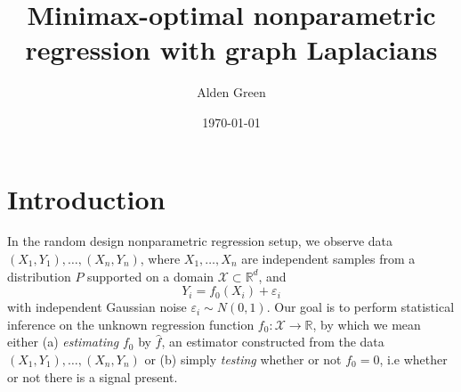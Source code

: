\documentclass{article}
\newcommand{\Reals}{\mathbb{R}}
\newcommand{\1}{\mathbf{1}}
\newcommand{\Rd}{\Reals^d}
\newcommand{\Xset}{\mathcal{X}}
\newcommand{\wh}[1]{\widehat{#1}}
\theoremstyle{alden}
\theoremstyle{aldenthm}
\theoremstyle{definition}
\theoremstyle{remark}
\begin{document}
\title{Minimax-optimal nonparametric regression with graph Laplacians}
\author{Alden Green}
\date{\today}
\maketitle

\section{Introduction}

In the random design nonparametric regression setup, we observe data $(X_1,Y_1),\ldots,(X_n,Y_n)$, where $X_1,\ldots,X_n$ are independent samples from a distribution $P$ supported on a domain $\Xset \subset \Rd$, and 
\begin{equation}
\label{eqn:random_design_regression}
Y_i = f_0(X_i) + \varepsilon_i
\end{equation}
with independent Gaussian noise $\varepsilon_i \sim N(0,1)$. Our goal is to perform statistical inference on the unknown regression function $f_0: \Xset \to \Reals$, by which we mean either (a) \emph{estimating} $f_0$ by $\wh{f}$, an estimator constructed from the data $(X_1,Y_1),\ldots,(X_n,Y_n)$ or (b) simply \emph{testing} whether or not $f_0 = 0$, i.e whether or not there is a signal present. 
\end{document}
